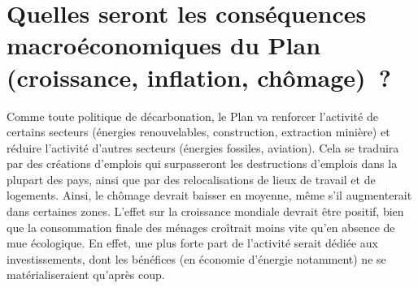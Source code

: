 \documentclass[a5paper,french,openany]{memoir}
\begin{document}
\section*{\normalsize Quelles seront les conséquences macroéconomiques du Plan (croissance, inflation, chômage)~?}\label{q:macro}

Comme toute politique de décarbonation, le Plan va renforcer l'activité de certains secteurs (énergies renouvelables, construction, extraction minière) et réduire l'activité d'autres secteurs (énergies fossiles, aviation). Cela se traduira par des créations d'emplois qui surpasseront les destructions d'emplois dans la plupart des pays, ainsi que par des relocalisations de lieux de travail et de logements. Ainsi, le chômage devrait baisser en moyenne, même s'il augmenterait dans certaines zones. L'effet sur la croissance mondiale devrait être positif, bien que la consommation finale des ménages croîtrait moins vite qu'en absence de mue écologique. En effet, une plus forte part de l'activité serait dédiée aux investissements, dont les bénéfices (en économie d'énergie notamment) ne se matérialiseraient qu'après coup. 
\end{document}
